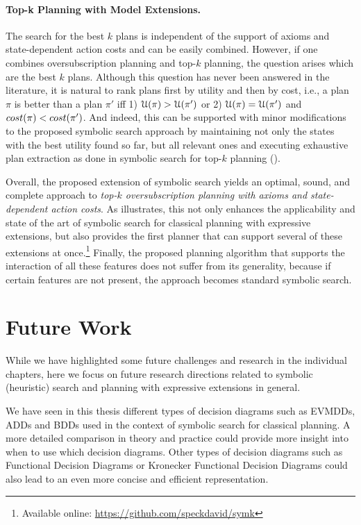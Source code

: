\paragraph{Top-k Planning with Model Extensions.}
The search for the best $k$ plans is independent of the support of axioms and state-dependent action costs and can be easily combined.
However, if one combines oversubscription planning and top-$k$ planning, the question arises which are the best $k$ plans.
Although this question has never been answered in the literature, it is natural to rank plans first by utility and then by cost, i.e., a plan $\pi$ is better than a plan $\pi'$ iff 1) $\mathcal U(\pi) > \mathcal U(\pi')$ or 2) $\mathcal U(\pi) = \mathcal U(\pi')$ and $cost(\pi) < cost(\pi')$.
And indeed, this can be supported with minor modifications to the proposed symbolic search approach by maintaining not only the states with the best utility found so far, but all relevant ones and executing exhaustive plan extraction as done in symbolic search for top-$k$ planning ().
\medskip

Overall, the proposed extension of symbolic search yields an optimal, sound, and complete approach to \emph{top-$k$ oversubscription planning with axioms and state-dependent action costs}.
As  illustrates, this not only enhances the applicability and state of the art of symbolic search for classical planning with expressive extensions, but also provides the first planner that can support several of these extensions at once.\footnote{Available online: \url{https://github.com/speckdavid/symk}}
Finally, the proposed planning algorithm that supports the interaction of all these features does not suffer from its generality, because if certain features are not present, the approach becomes standard symbolic search.

\section{Future Work}\label{sec:future_work}
While we have highlighted some future challenges and research in the individual chapters, here we focus on future research directions related to symbolic (heuristic) search and planning with expressive extensions in general.

We have seen in this thesis different types of decision diagrams such as EVMDDs, ADDs and BDDs used in the context of symbolic search for classical planning.
A more detailed comparison in theory and practice could provide more insight into when to use which decision diagrams.
Other types of decision diagrams such as Functional Decision Diagrams \autocite{kebschull-et-al-dac1992} or Kronecker Functional Decision Diagrams \autocite{drechsler-becker-tcad1998} could also lead to an even more concise and efficient representation.

